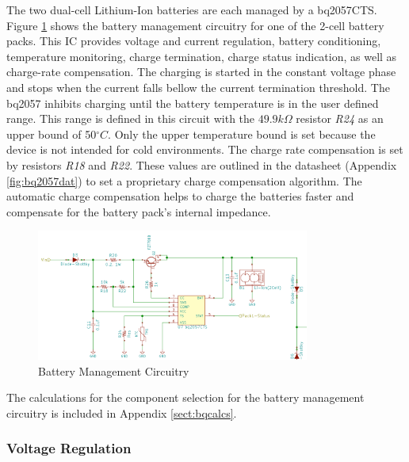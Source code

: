 \documentclass{article}
\numberwithin{figure}{section}
\numberwithin{equation}{section}
\begin{document}
{The two dual-cell Lithium-Ion batteries are each managed by a bq2057CTS. Figure \ref{fig:batman} shows the battery management circuitry for one of the 2-cell battery packs. This IC provides voltage and current regulation, battery conditioning, temperature monitoring, charge termination, charge status indication, as well as charge-rate compensation. The charging is started in the constant voltage phase and stops when the current falls bellow the current termination threshold. The bq2057 inhibits charging until the battery temperature is in the user defined range. This range is defined in this circuit with the $49.9k\Omega$ resistor \textit{R24} as an upper bound of 50$^{\circ}C$. Only the upper temperature bound is set because the device is not intended for cold environments. The charge rate compensation is set by resistors \textit{R18} and \textit{R22}. These values are outlined in the datasheet (Appendix \ref{fig:bq2057dat}) to set a proprietary charge compensation algorithm. The automatic charge compensation helps to charge the batteries faster and compensate for the battery pack's internal impedance.

\begin{figure}[H]
	\centering
	\includegraphics[width=0.8\textwidth]{BatteryManage}
	\caption{Battery Management Circuitry}
	\label{fig:batman}
\end{figure}

The calculations for the component selection for the battery management circuitry is included in Appendix \ref{sect:bqcalcs}.

\subsubsection{Voltage Regulation}

}
\end{document}
